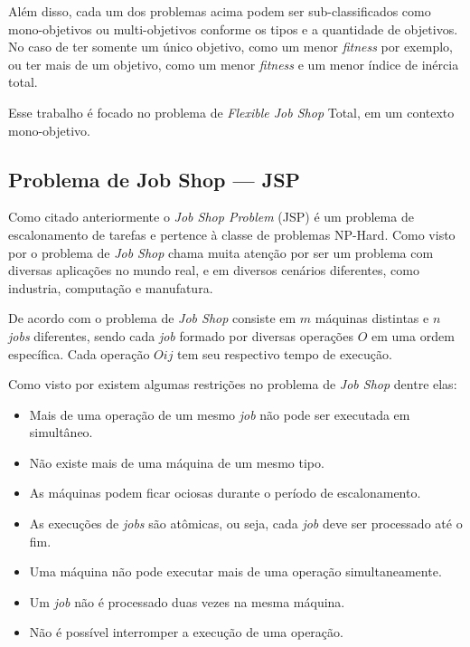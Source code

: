         Além disso, cada um dos problemas acima podem ser sub-classificados como mono-objetivos ou multi-objetivos conforme os tipos e a quantidade de objetivos. \newline
        No caso de ter somente um único objetivo, como um menor \textit{fitness} por exemplo, ou ter mais de um objetivo, como um menor \textit{fitness} e um menor índice de inércia total.\newline

        Esse trabalho é focado no problema de \textit{Flexible Job Shop} Total, em um contexto mono-objetivo.


    \subsection{Problema de Job Shop — JSP}
            Como citado anteriormente o \textit{Job Shop Problem} (JSP) é um problema de escalonamento de tarefas e pertence à classe de problemas NP-Hard. Como visto por \cite{Cheng1996} o problema de \textit{Job Shop} chama muita atenção por ser um problema com diversas aplicações no mundo real, e em diversos cenários diferentes, como industria, computação e manufatura.\newline

            De acordo com \cite{Cheng1996} o problema de \textit{Job Shop} consiste em $m$ máquinas distintas e $n$ \textit{jobs} diferentes, sendo cada \textit{job} formado por diversas operações $O$ em uma ordem específica. Cada operação $Oij$ tem seu respectivo tempo de execução.\newline

            Como visto por \cite{Bagchi1999} existem algumas restrições no problema de \textit{Job Shop} dentre elas:
            \begin{itemize}
                \item Mais de uma operação de um mesmo \textit{job} não pode ser executada em simultâneo.
                \item Não existe mais de uma máquina de um mesmo tipo.
                \item As máquinas podem ficar ociosas durante o período de escalonamento.
                \item As execuções de \textit{jobs} são atômicas, ou seja, cada \textit{job} deve ser processado até o fim.
                \item Uma máquina não pode executar mais de uma operação simultaneamente.
                \item Um \textit{job} não é processado duas vezes na mesma máquina.
                \item Não é possível interromper a execução de uma operação.
            \end{itemize}
        
